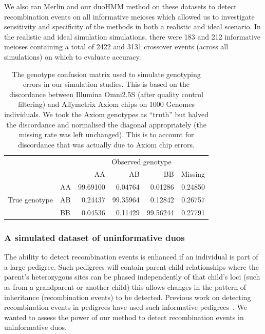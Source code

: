 We also ran Merlin and our duoHMM method on these datasets to detect recombination events on all informative meioses which allowed us to investigate sensitivity and specificity of the methods in both a realistic and ideal scenario. In the realistic and ideal simulation simulations, there were 183 and 212 informative meioses containing a total of 2422 and 3131 crossover events (across all simulations) on which to evaluate accuracy.
 
\begin{table}[h]
        \vspace{20pt}        
\centering
\begin{tabular}{|c|l|rrrr|}
  \hline
  &  &\multicolumn{4}{c|}{Observed genotype}\\
  &  & AA & AB & BB & Missing \\ 
  \hline
  \multirow{3}{*}{True genotype} & AA & 99.69100 & 0.04764 & 0.01286 & 0.24850 \\ 
  & AB & 0.24437 & 99.35964 & 0.12842 & 0.26757 \\ 
  & BB & 0.04536 & 0.11429 & 99.56244 & 0.27791 \\ 
   \hline
\end{tabular}
\caption[Genotype error model used in our simulations]{The genotype confusion matrix used to simulate genotyping errors in our simulation studies. This is based on the discordance between Illumina Omni2.5S (after quality control filtering) and Affymetrix Axiom chips on 1000 Genomes individuals. We took the Axiom genotypes as ``truth'' but halved the discordance and normalised the diagonal appropriately (the missing rate was left unchanged). This is to account for discordance that was actually due to Axiom chip errors. \label{tab:confusion_matrix}}
\end{table}

\subsubsection{A simulated dataset of uninformative duos}

The ability to detect recombination events is enhanced if an individual is part of a large pedigree. Such pedigrees will contain parent-child relationships where the parent's heterozygous sites can be phased independently of that child's loci (such as from a grandparent or another child) this allows changes in the pattern of inheritance (recombination events) to be detected. Previous work on detecting recombination events in pedigrees have used such informative pedigrees~\citep{coop2008high,kong2002,matise2007second,hinch2011landscape}. We wanted to assess the power of our method to detect recombination events in uninformative duos. 

